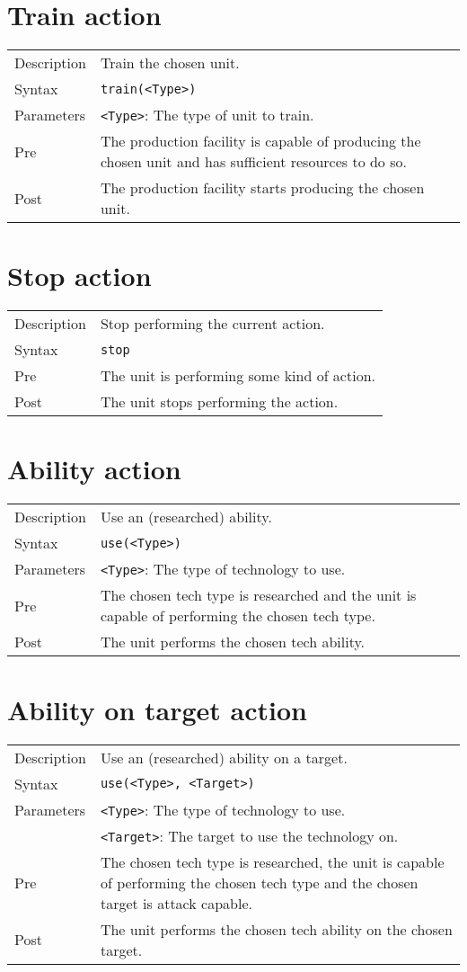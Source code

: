 \section{Train action}
\begin{tabularx}{\textwidth}{lX}
 Description & Train the chosen unit. \\
 Syntax & \verb|train(<Type>)| \\
 Parameters & \verb|<Type>|: The type of unit to train.\\
 Pre & The production facility is capable of producing the chosen unit and has sufficient resources to do so. \\
 Post & The production facility starts producing the chosen unit.
\end{tabularx}

\section{Stop action}
\begin{tabularx}{\textwidth}{lX}
 Description & Stop performing the current action. \\
 Syntax & \verb|stop| \\
 Pre & The unit is performing some kind of action. \\
 Post & The unit stops performing the action.
\end{tabularx}

\section{Ability action}
\begin{tabularx}{\textwidth}{lX}
 Description & Use an (researched) ability. \\
 Syntax & \verb|use(<Type>)| \\
 Parameters & \verb|<Type>|: The type of technology to use.\\
 Pre & The chosen tech type is researched and the unit is capable of performing the chosen tech type. \\
 Post & The unit performs the chosen tech ability.
\end{tabularx}

\section{Ability on target action}
\begin{tabularx}{\textwidth}{lX}
 Description & Use an (researched) ability on a target. \\
 Syntax & \verb|use(<Type>, <Target>)| \\
 Parameters & \verb|<Type>|: The type of technology to use.\\
            & \verb|<Target>|: The target to use the technology on.\\
 Pre & The chosen tech type is researched, the unit is capable of performing the chosen tech type and the chosen target is attack capable. \\
 Post & The unit performs the chosen tech ability on the chosen target.
\end{tabularx}

